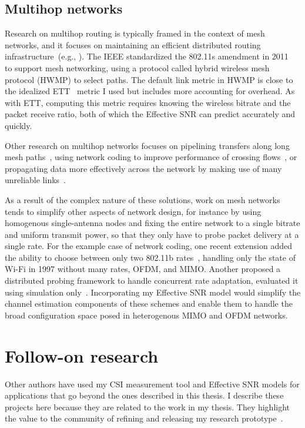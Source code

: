 \subsection{Multihop networks}
Research on multihop routing is typically framed in the context of mesh networks, and it focuses on maintaining an efficient distributed routing infrastructure~(e.g., \cite{Athanasiou_Mesh,RFC_AODV,Draves_ETT,Rozner_SOAR}). The IEEE standardized the 802.11s amendment in 2011~\cite{80211s} to support mesh networking, using a protocol called hybrid wireless mesh protocol (HWMP) to select paths. The default link metric in HWMP is close to the idealized ETT~\cite{Draves_ETT} metric I used but includes more accounting for overhead. As with ETT, computing this metric requires knowing the wireless bitrate and the packet receive ratio, both of which the Effective SNR can predict accurately and quickly.

Other research on multihop networks focuses on pipelining transfers along long mesh paths~\cite{Li_BlockSwitched,Li_Mesh,Rodrig_thesis}, using network coding to improve performance of crossing flows~\cite{Katti_ANC,Katti_XORs,Ni_CodingRates}, or propagating data more effectively across the network by making use of many unreliable links~\cite{Biswas_ExOR}.

As a result of the complex nature of these solutions, work on mesh networks tends to simplify other aspects of network design, for instance by using homogenous single-antenna nodes and fixing the entire network to a single bitrate and uniform transmit power, so that they only have to probe packet delivery at a single rate. For the example case of network coding, one recent extension added the ability to choose between only two 802.11b rates~\cite{Ni_CodingRates}, handling only the state of Wi-Fi in 1997 without many rates, OFDM, and MIMO. Another proposed a distributed probing framework to handle concurrent rate adaptation, evaluated it using simulation only~\cite{Kim_NetworkCoding}. Incorporating my Effective SNR model would simplify the channel estimation components of these schemes and enable them to handle the broad configuration space posed in heterogenous MIMO and OFDM networks.

\section{Follow-on research}
Other authors have used my CSI measurement tool and Effective SNR models for applications that go beyond the ones described in this thesis. I describe these projects here because they are related to the work in my thesis. They highlight the value to the community of refining and releasing my research prototype~\cite{Halperin_csitool}.

